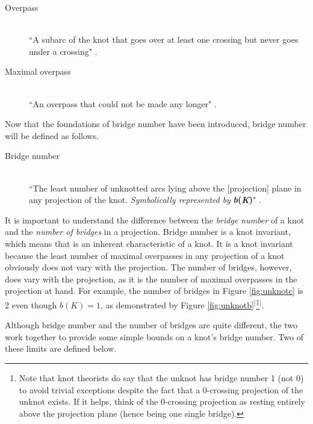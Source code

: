\documentclass[titlepage]{article}
\newcommand{\dq}[4][]{``#2"#1 \cite[#4]{#3}.}
\begin{document}
\begin{defi}
    \begin{description}
        \item[Overpass] \hfill \\ \dq{A subarc of the knot that goes over at least one crossing but never goes under a crossing}{bib:knotbook}{64}
        \item[Maximal overpass] \hfill \\ \dq{An overpass that could not be made any longer}{bib:knotbook}{65}
    \end{description}
\end{defi}

Now that the foundations of bridge number have been introduced, bridge number will be defined as follows.

\begin{defi}
    \begin{description}
        \item[Bridge number] \hfill \\ \dq{The least number of unknotted arcs lying above the [projection] plane in any projection of the knot. \emph{Symbolically represented by} \textbf{\emph{b}(\emph{K})}}{bib:knotnotes}{25}
    \end{description}
\end{defi}

It is important to understand the difference between the \emph{bridge number} of a knot and the \emph{number of bridges} in a projection. Bridge number is a knot invariant, which means that is an inherent characteristic of a knot. It is a knot invariant because the least number of maximal overpasses in any projection of a knot obviously does not vary with the projection. The number of bridges, however, does vary with the projection, as it is the number of maximal overpasses in the projection at hand. For example, the number of bridges in Figure \ref{fig:unknotc} is 2 even though $b(K)=1$, as demonstrated by Figure \ref{fig:unknotb}$^[$\footnote{Note that knot theorists do say that the unknot has bridge number 1 (not 0) to avoid trivial exceptions despite the fact that a 0-crossing projection of the unknot exists. If it helps, think of the 0-crossing projection as resting entirely above the projection plane (hence being one single bridge).}$^]$.\par
Although bridge number and the number of bridges are quite different, the two work together to provide some simple bounds on a knot's bridge number. Two of these limits are defined below.
\end{document}
